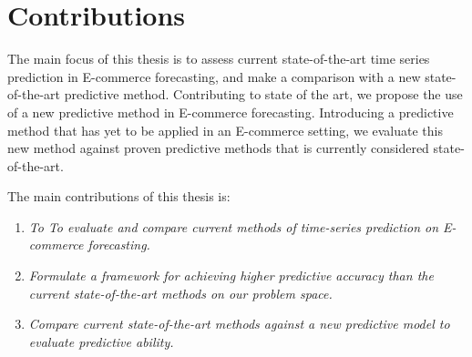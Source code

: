 \section{Contributions}
\label{sections:Introduction:Contributions}



The main focus of this thesis is to assess current state-of-the-art time series prediction in E-commerce forecasting,
and make a comparison with a new state-of-the-art predictive method.
Contributing to state of the art,
we propose the use of a new predictive method in E-commerce forecasting.
Introducing a predictive method that has yet to be applied in an E-commerce setting,
we evaluate this new method against proven predictive methods that is currently considered state-of-the-art.

The main contributions of this thesis is:
\begin{enumerate}
  \item {\it To To evaluate and compare current methods of time-series prediction on E-commerce forecasting.}
  \item {\it Formulate a framework for achieving higher predictive accuracy than the current state-of-the-art methods on our problem space.}
  \item {\it Compare current state-of-the-art methods against a new predictive model to evaluate predictive ability.}
\end{enumerate}




\iffalse
The main focus of this work is to assess the current state of time-series prediction in E-commerce forecasting.
Contributing to the current state of the art,
we propose a method for increasing the predictive ability of time-series forecasting
assessing interest trends of e-commerce product categories.
The main contributions of this paper are:

\begin{enumerate}
  \item {\it To evaluate and compare current methods of time-series prediction on e-commerce.}
  \item {\it To evaluate and compare current state-of-the-art methods for time-series forecasting.}
  \item {\it Formulates a framework for achieving higher predictive accuracy than the current state-of-the-art methods on our problem space.}
\end{enumerate}
\fi


